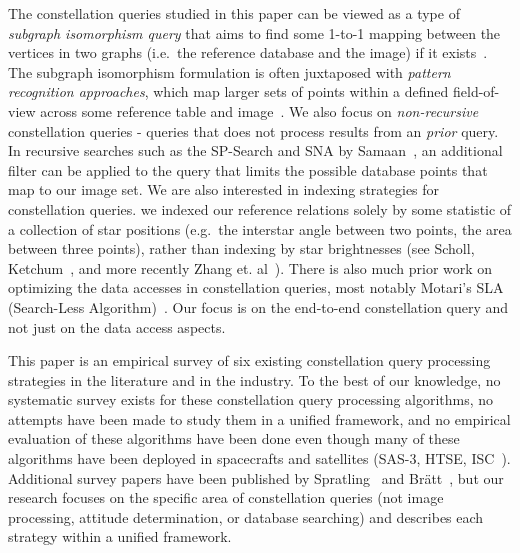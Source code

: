 The constellation queries studied in this paper can be viewed as a type of
\emph{subgraph isomorphism query} that aims to find some 1-to-1 mapping between
the vertices in two graphs (i.e.\ the reference database and the image) if it
exists~\cite{scott:graphIsomorphismProblem}. The subgraph isomorphism
formulation is often juxtaposed with \emph{pattern recognition approaches},
which map larger sets of points within a defined field-of-view across some
reference table and image~\cite{padgett:gridAlgorithm}.
We also focus on \emph{non-recursive} constellation queries -  
queries that does not process results from an \emph{prior} query.
In recursive searches such as the SP-Search and SNA by
Samaan~\cite{samaan:recursiveMode}, an additional filter can be applied to the
query that limits the possible database points that map to our image set.
We are also interested in indexing strategies for constellation queries.
we indexed our reference relations solely by some statistic of a collection of
star positions (e.g.\ the interstar angle between two points, the area between
three points), rather than indexing by star brightnesses (see Scholl\cite{scholl:starFieldIdentification}, Ketchum~\cite{ketchum:onboardStarIdentification}, and more recently Zhang et. al~\cite{zhang:brightnessReferenced}).
There is also much prior work on optimizing the data accesses in
constellation queries, most notably Motari's SLA (Search-Less
Algorithm)~\cite{mortari:kVectorApproach}. Our focus is on the end-to-end
constellation query and not just on the data access aspects. 

This paper is an empirical survey of six existing constellation query processing strategies in the literature and in the industry.
To the best of our knowledge, no systematic survey exists for these constellation query processing algorithms, no attempts have been made to study them in a unified framework, and no empirical evaluation of these algorithms have been done even though many of these algorithms have been deployed in spacecrafts and satellites (SAS-3, HTSE, ISC~\cite{gottlieb:spacecraftAttitudeDetermination,mortari:pyramidIdentification}).
Additional survey papers have been published by Spratling~\cite{spratling:surveyStarIdentification} and
Br\"{a}tt~\cite{bratt:analysisStarIdentification}, but our research focuses on the specific area of constellation
queries (not image processing, attitude determination, or database searching) and describes each strategy within a unified framework.

